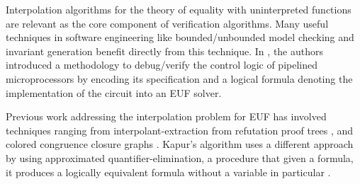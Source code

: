Interpolation algorithms for the theory of equality 
with uninterpreted functions are relevant as the core 
component of verification algorithms. Many useful techniques 
in software engineering like bounded/unbounded model 
checking and invariant generation benefit directly from 
this technique. In \cite{10.1007/3-540-58179-0_44}, the 
authors introduced a methodology to debug/verify the 
control logic of pipelined microprocessors by encoding 
its specification and a logical formula denoting the 
implementation of the circuit into an EUF solver.

Previous work addressing the interpolation problem for 
EUF has involved techniques ranging from
interpolant-extraction from refutation proof 
trees \cite{10.1007/978-3-540-24730-2_2, mcmillan2011interpolants, 
10.1007/978-3-642-31612-8_24}, and colored congruence closure
graphs \cite{10.1007/978-3-642-00768-2_34}. Kapur's algorithm 
uses a different approach by using approximated
quantifier-elimination, a procedure that given a formula, 
it produces a logically equivalent formula
 without a variable in particular \cite{DBLP:books/daglib/0076838}.

